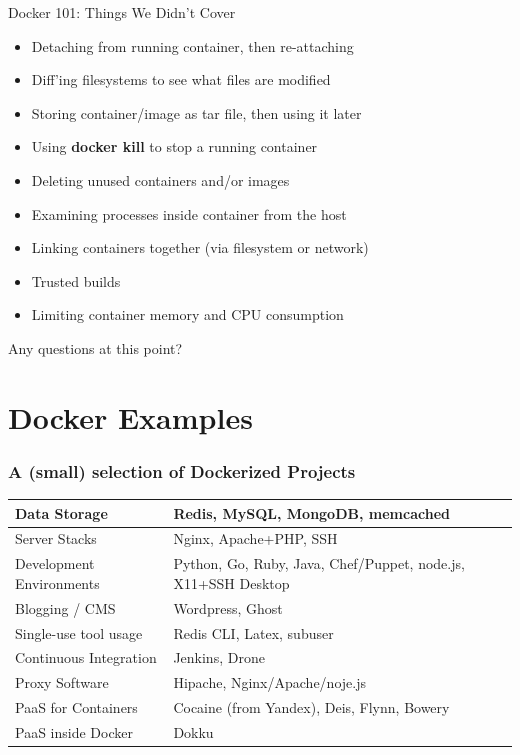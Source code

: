 \documentclass[xcolor=dvipsnames]{beamer}
\begin{document}
\begin{frame}{Docker 101: Things We Didn't Cover}  
  \begin{itemize}
  \item Detaching from running container, then re-attaching
  \item Diff'ing filesystems to see what files are modified
  \item Storing container/image as tar file, then using it later
  \item Using \textbf{docker kill} to stop a running container
  \item Deleting unused containers and/or images
  \item Examining processes inside container from the host
  \item Linking containers together (via filesystem or network)
  \item Trusted builds
  \item Limiting container memory and CPU consumption
  \end{itemize}

  \vspace{8mm}
  {\LARGE Any questions at this point? }
\end{frame}

\section{Docker Examples}

\begin{frame}
  \frametitle{A (small) selection of Dockerized Projects}

  \begin{tabular}{p{}|p{}}
  Data Storage             & Redis, MySQL, MongoDB, memcached                              \\ \hline
  Server Stacks            & Nginx, Apache+PHP, SSH                                        \\ \hline
  Development \linebreak Environments & Python, Go, Ruby, Java, Chef/Puppet, node.js, X11+SSH Desktop \\ \hline
  Blogging / CMS           & Wordpress, Ghost                                              \\ \hline
  Single-use tool usage    & Redis CLI, Latex, subuser                                     \\ \hline
  Continuous Integration   & Jenkins, Drone                                                \\ \hline
  Proxy Software           & Hipache, Nginx/Apache/noje.js                                 \\ \hline
  PaaS for Containers      & Cocaine (from Yandex), Deis, Flynn, Bowery                    \\ \hline
  PaaS inside Docker       & Dokku                                                         \\ 
  \end{tabular}
\end{frame}
\end{document}
